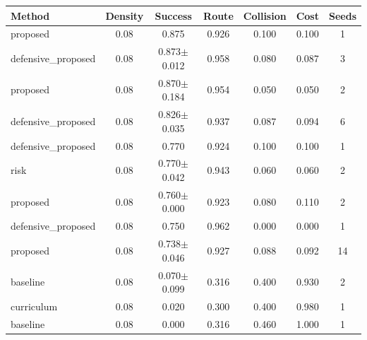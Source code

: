 \begin{tabular}{lcccccc}
\toprule
Method & Density & Success & Route & Collision & Cost & Seeds \\ 
\midrule
proposed & 0.08 & 0.875 & 0.926 & 0.100 & 0.100 & 1 \\ 
defensive_proposed & 0.08 & 0.873$\pm$0.012 & 0.958 & 0.080 & 0.087 & 3 \\ 
proposed & 0.08 & 0.870$\pm$0.184 & 0.954 & 0.050 & 0.050 & 2 \\ 
defensive_proposed & 0.08 & 0.826$\pm$0.035 & 0.937 & 0.087 & 0.094 & 6 \\ 
defensive_proposed & 0.08 & 0.770 & 0.924 & 0.100 & 0.100 & 1 \\ 
risk & 0.08 & 0.770$\pm$0.042 & 0.943 & 0.060 & 0.060 & 2 \\ 
proposed & 0.08 & 0.760$\pm$0.000 & 0.923 & 0.080 & 0.110 & 2 \\ 
defensive_proposed & 0.08 & 0.750 & 0.962 & 0.000 & 0.000 & 1 \\ 
proposed & 0.08 & 0.738$\pm$0.046 & 0.927 & 0.088 & 0.092 & 14 \\ 
baseline & 0.08 & 0.070$\pm$0.099 & 0.316 & 0.400 & 0.930 & 2 \\ 
curriculum & 0.08 & 0.020 & 0.300 & 0.400 & 0.980 & 1 \\ 
baseline & 0.08 & 0.000 & 0.316 & 0.460 & 1.000 & 1 \\ 
\bottomrule
\end{tabular}
